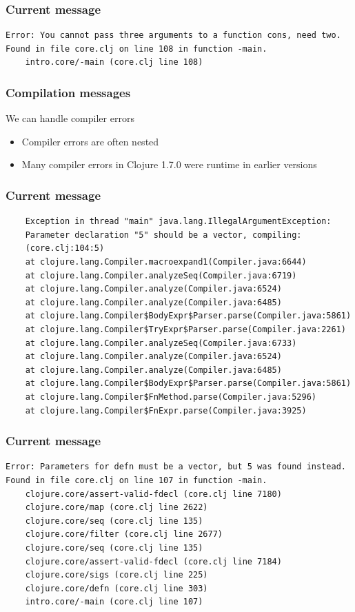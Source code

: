\documentclass{beamer}
\begin{document}
\begin{frame}[fragile]
\frametitle{Current message}
		\begin{verbatim}
Error: You cannot pass three arguments to a function cons, need two.
Found in file core.clj on line 108 in function -main.
	intro.core/-main (core.clj line 108)
	\end{verbatim}	
\end{frame}

\begin{frame}[fragile]
\frametitle{Compilation messages}
	We can handle compiler errors
	\begin{itemize}
	\item Compiler errors are often nested
	\item Many compiler errors in Clojure 1.7.0 were runtime in earlier versions
	\end{itemize}
\end{frame}

\begin{frame}[fragile]
\frametitle{Current message}
	\begin{verbatim}
	Exception in thread "main" java.lang.IllegalArgumentException:
	Parameter declaration "5" should be a vector, compiling:
	(core.clj:104:5)
	at clojure.lang.Compiler.macroexpand1(Compiler.java:6644)
	at clojure.lang.Compiler.analyzeSeq(Compiler.java:6719)
	at clojure.lang.Compiler.analyze(Compiler.java:6524)
	at clojure.lang.Compiler.analyze(Compiler.java:6485)
	at clojure.lang.Compiler$BodyExpr$Parser.parse(Compiler.java:5861)
	at clojure.lang.Compiler$TryExpr$Parser.parse(Compiler.java:2261)
	at clojure.lang.Compiler.analyzeSeq(Compiler.java:6733)
	at clojure.lang.Compiler.analyze(Compiler.java:6524)
	at clojure.lang.Compiler.analyze(Compiler.java:6485)
	at clojure.lang.Compiler$BodyExpr$Parser.parse(Compiler.java:5861)
	at clojure.lang.Compiler$FnMethod.parse(Compiler.java:5296)
	at clojure.lang.Compiler$FnExpr.parse(Compiler.java:3925)
	\end{verbatim}	
\end{frame}

\begin{frame}[fragile]
\frametitle{Current message}
		\begin{verbatim}
Error: Parameters for defn must be a vector, but 5 was found instead.
Found in file core.clj on line 107 in function -main.
	clojure.core/assert-valid-fdecl (core.clj line 7180)
	clojure.core/map (core.clj line 2622)
	clojure.core/seq (core.clj line 135)
	clojure.core/filter (core.clj line 2677)
	clojure.core/seq (core.clj line 135)
	clojure.core/assert-valid-fdecl (core.clj line 7184)
	clojure.core/sigs (core.clj line 225)
	clojure.core/defn (core.clj line 303)
	intro.core/-main (core.clj line 107)
		\end{verbatim}	
\end{frame}
\end{document}
